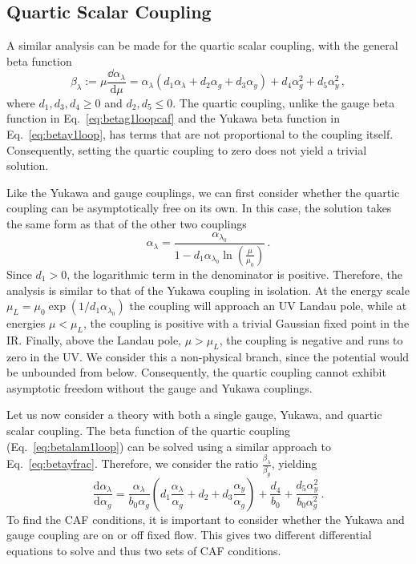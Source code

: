 
\subsection{Quartic Scalar Coupling}\label{sec:CAGquartic}
A similar analysis can be made for the quartic scalar coupling, with the general beta function 
\begin{equation}
    \beta_\lambda:=\mu \frac{\dd \alpha_\lambda}{\text{d}\mu}=\alpha_\lambda\left(d_1\alpha_\lambda + d_2\alpha_g+d_3\alpha_y\right)+d_4\alpha_g^2+d_5\alpha_y^2\,,\label{eq:betalam1loop}
\end{equation}
where $d_1,d_3,d_4\ge0$ and $d_2,d_5\le 0$. The quartic coupling, unlike the gauge beta function in Eq.~\eqref{eq:betag1loopcaf} and the Yukawa beta function in Eq.~\eqref{eq:betay1loop}, has terms that are not proportional to the coupling itself. Consequently, setting the quartic coupling to zero does not yield a trivial solution. 

Like the Yukawa and gauge couplings, we can first consider whether the quartic coupling can be asymptotically free on its own. In this case, the solution takes the same form as that of the other two couplings
\begin{equation}
    \alpha_\lambda=\frac{\alpha_{\lambda_0}}{1-d_1 \alpha_{\lambda_0} \ln \left(\frac{\mu}{\mu_0 }\right)}\,.
\end{equation}
Since $d_1>0$, the logarithmic term in the denominator is positive. Therefore, the analysis is similar to that of the Yukawa coupling in isolation. At the energy scale $\mu_L=\mu_0\exp(1/{d_1\alpha_{\lambda_0}})$ the coupling will approach an UV Landau pole, while at energies $\mu<\mu_L$, the coupling is positive with a trivial Gaussian fixed point in the IR. Finally, above the Landau pole, $\mu>\mu_L$, the coupling is negative and runs to zero in the UV. We consider this a non-physical branch, since the potential would be unbounded from below. Consequently, the quartic coupling cannot exhibit asymptotic freedom without the gauge and Yukawa couplings. 

Let us now consider a theory with both a single gauge, Yukawa, and quartic scalar coupling. The beta function of the quartic coupling (Eq.~\eqref{eq:betalam1loop}) can be solved using a similar approach to Eq.~\eqref{eq:betayfrac}. Therefore, we consider the ratio $\frac{\beta_\lambda}{\beta_g}$, yielding
\begin{equation}
    \frac{\text{d} \alpha_\lambda}{\text{d}\alpha_g}=\frac{\alpha_\lambda}{b_0\alpha_g}\left(d_1\frac{\alpha_\lambda}{\alpha_g} + d_2+d_3\frac{\alpha_y}{\alpha_g}\right)+\frac{d_4}{b_0}+\frac{d_5 \alpha_y^2}{b_0\alpha_g^2}\,.
\end{equation}
To find the CAF conditions, it is important to consider whether the Yukawa and gauge coupling are on or off fixed flow. This gives two different differential equations to solve and thus two sets of CAF conditions.


